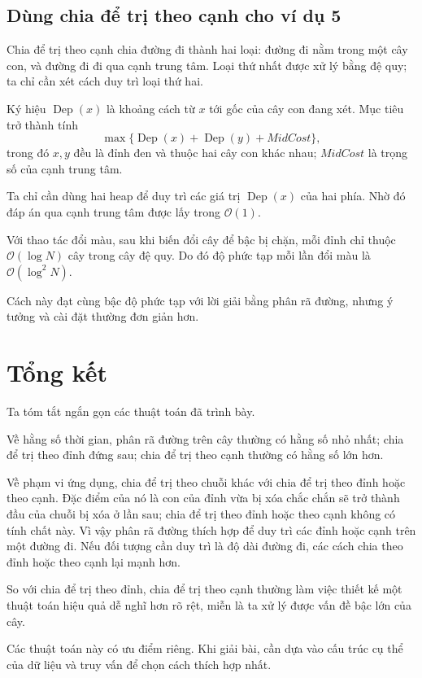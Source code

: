 \documentclass[11pt]{article}
\newcommand{\Oh}{\mathcal{O}}
\newcommand{\Dep}{\operatorname{Dep}}
\begin{document}
\subsection{Dùng chia để trị theo cạnh cho ví dụ 5}

Chia để trị theo cạnh chia đường đi thành hai loại: đường đi nằm trong một cây
con, và đường đi đi qua cạnh trung tâm. Loại thứ nhất được xử lý bằng đệ quy;
ta chỉ cần xét cách duy trì loại thứ hai.

Ký hiệu \(\Dep(x)\) là khoảng cách từ \(x\) tới gốc của cây con đang xét. Mục
tiêu trở thành tính
\[
  \max\{\Dep(x)+\Dep(y)+\mathit{MidCost}\},
\]
trong đó \(x,y\) đều là đỉnh đen và thuộc hai cây con khác nhau;
\(\mathit{MidCost}\) là trọng số của cạnh trung tâm.

Ta chỉ cần dùng hai heap để duy trì các giá trị \(\Dep(x)\) của hai phía. Nhờ
đó đáp án qua cạnh trung tâm được lấy trong \(\Oh(1)\).

Với thao tác đổi màu, sau khi biến đổi cây để bậc bị chặn, mỗi đỉnh chỉ thuộc
\(\Oh(\log N)\) cây trong cây đệ quy. Do đó độ phức tạp mỗi lần đổi màu là
\(\Oh(\log^2 N)\).

Cách này đạt cùng bậc độ phức tạp với lời giải bằng phân rã đường, nhưng ý
tưởng và cài đặt thường đơn giản hơn.

\section{Tổng kết}

Ta tóm tắt ngắn gọn các thuật toán đã trình bày.

Về hằng số thời gian, phân rã đường trên cây thường có hằng số nhỏ nhất; chia
để trị theo đỉnh đứng sau; chia để trị theo cạnh thường có hằng số lớn hơn.

Về phạm vi ứng dụng, chia để trị theo chuỗi khác với chia để trị theo đỉnh
hoặc theo cạnh. Đặc điểm của nó là con của đỉnh vừa bị xóa chắc chắn sẽ trở
thành đầu của chuỗi bị xóa ở lần sau; chia để trị theo đỉnh hoặc theo cạnh
không có tính chất này. Vì vậy phân rã đường thích hợp để duy trì các đỉnh
hoặc cạnh trên một đường đi. Nếu đối tượng cần duy trì là độ dài đường đi, các
cách chia theo đỉnh hoặc theo cạnh lại mạnh hơn.

So với chia để trị theo đỉnh, chia để trị theo cạnh thường làm việc thiết kế
một thuật toán hiệu quả dễ nghĩ hơn rõ rệt, miễn là ta xử lý được vấn đề bậc
lớn của cây.

Các thuật toán này có ưu điểm riêng. Khi giải bài, cần dựa vào cấu trúc cụ
thể của dữ liệu và truy vấn để chọn cách thích hợp nhất.
\end{document}
